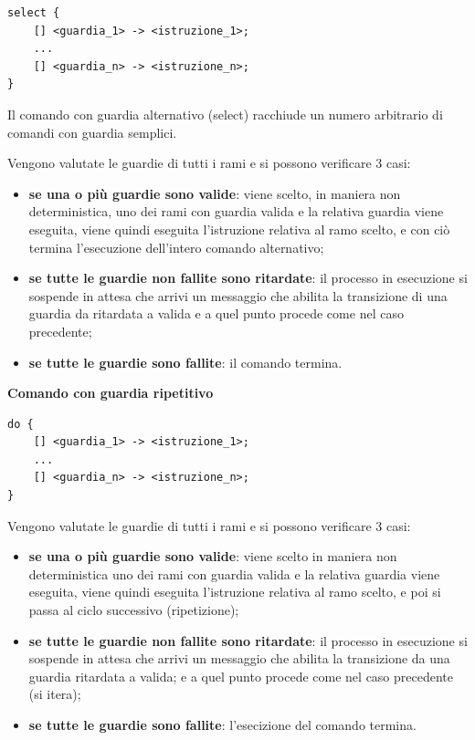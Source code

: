 \documentclass{article}
\begin{document}
\begin{lstlisting}
select {
    [] <guardia_1> -> <istruzione_1>;
    ...
    [] <guardia_n> -> <istruzione_n>;
}
\end{lstlisting}

Il comando con guardia alternativo (select) racchiude un numero arbitrario di comandi con guardia semplici.

Vengono valutate le guardie di tutti i rami e si possono verificare 3 casi:
\begin{itemize}
    \item \textbf{se una o più guardie sono valide}: viene scelto, in maniera non deterministica, uno dei rami con guardia valida e la relativa guardia viene eseguita, viene quindi eseguita
    l'istruzione relativa al ramo scelto, e con ciò termina l'esecuzione dell'intero comando alternativo;
    \item \textbf{se tutte le guardie non fallite sono ritardate}: il processo in esecuzione si sospende in attesa che arrivi un messaggio che abilita la transizione di una guardia da
    ritardata a valida e a quel punto procede come nel caso precedente;
    \item \textbf{se tutte le guardie sono fallite}: il comando termina.
\end{itemize}

\vspace{5mm}
\textbf{Comando con guardia ripetitivo}

\vspace{3mm}

\begin{lstlisting}
do {
    [] <guardia_1> -> <istruzione_1>;
    ...
    [] <guardia_n> -> <istruzione_n>;
}
\end{lstlisting}

Vengono valutate le guardie di tutti i rami e si possono verificare 3 casi:
\begin{itemize}
    \item \textbf{se una o più guardie sono valide}: viene scelto in maniera non deterministica uno dei rami con guardia valida e la relativa guardia viene eseguita, viene quindi eseguita
    l'istruzione relativa al ramo scelto, e poi si passa al ciclo successivo (ripetizione);
    \item \textbf{se tutte le guardie non fallite sono ritardate}: il processo in esecuzione si sospende in attesa che arrivi un messaggio che abilita la transizione da una guardia ritardata
    a valida; e a quel punto procede come nel caso precedente (si itera);
    \item \textbf{se tutte le guardie sono fallite}: l'esecizione del comando termina.
\end{itemize}
\end{document}

